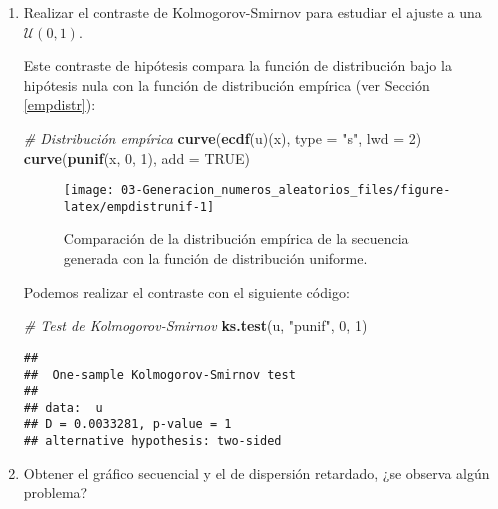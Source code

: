\documentclass[
]{book}
\newenvironment{Shaded}{\begin{snugshade}}{\end{snugshade}}
\newcommand{\CommentTok}[1]{\textcolor[rgb]{0.56,0.35,0.01}{\textit{#1}}}
\newcommand{\DataTypeTok}[1]{\textcolor[rgb]{0.13,0.29,0.53}{#1}}
\newcommand{\DecValTok}[1]{\textcolor[rgb]{0.00,0.00,0.81}{#1}}
\newcommand{\KeywordTok}[1]{\textcolor[rgb]{0.13,0.29,0.53}{\textbf{#1}}}
\newcommand{\NormalTok}[1]{#1}
\newcommand{\OtherTok}[1]{\textcolor[rgb]{0.56,0.35,0.01}{#1}}
\newcommand{\StringTok}[1]{\textcolor[rgb]{0.31,0.60,0.02}{#1}}
\theoremstyle{break}
\theoremstyle{definition}
\theoremstyle{definition}
\theoremstyle{definition}
\theoremstyle{remark}
\begin{document}
\begin{enumerate}
\def\labelenumi{\alph{enumi})}
\item
  Realizar el contraste de Kolmogorov-Smirnov para estudiar el
  ajuste a una \(\mathcal{U}(0,1)\).

  Este contraste de hipótesis compara la función de distribución bajo la hipótesis nula con la función de distribución empírica (ver Sección \ref{empdistr}):

\begin{Shaded}
\begin{Highlighting}[]
\CommentTok{# Distribución empírica}
\KeywordTok{curve}\NormalTok{(}\KeywordTok{ecdf}\NormalTok{(u)(x), }\DataTypeTok{type =} \StringTok{"s"}\NormalTok{, }\DataTypeTok{lwd =} \DecValTok{2}\NormalTok{)}
\KeywordTok{curve}\NormalTok{(}\KeywordTok{punif}\NormalTok{(x, }\DecValTok{0}\NormalTok{, }\DecValTok{1}\NormalTok{), }\DataTypeTok{add =} \OtherTok{TRUE}\NormalTok{)}
\end{Highlighting}
\end{Shaded}

  \begin{figure}[!htb]

  {\centering \texttt{[image: 03-Generacion\_numeros\_aleatorios\_files/figure-latex/empdistrunif-1]} 

  }

  \caption{Comparación de la distribución empírica de la secuencia generada con la función de distribución uniforme.}\label{fig:empdistrunif}
  \end{figure}

  Podemos realizar el contraste con el siguiente código:

\begin{Shaded}
\begin{Highlighting}[]
\CommentTok{# Test de Kolmogorov-Smirnov}
\KeywordTok{ks.test}\NormalTok{(u, }\StringTok{"punif"}\NormalTok{, }\DecValTok{0}\NormalTok{, }\DecValTok{1}\NormalTok{)}
\end{Highlighting}
\end{Shaded}

\begin{verbatim}
## 
##  One-sample Kolmogorov-Smirnov test
## 
## data:  u
## D = 0.0033281, p-value = 1
## alternative hypothesis: two-sided
\end{verbatim}
\item
  Obtener el gráfico secuencial y el de dispersión retardado, ¿se
  observa algún problema?


\end{enumerate}
\end{document}
